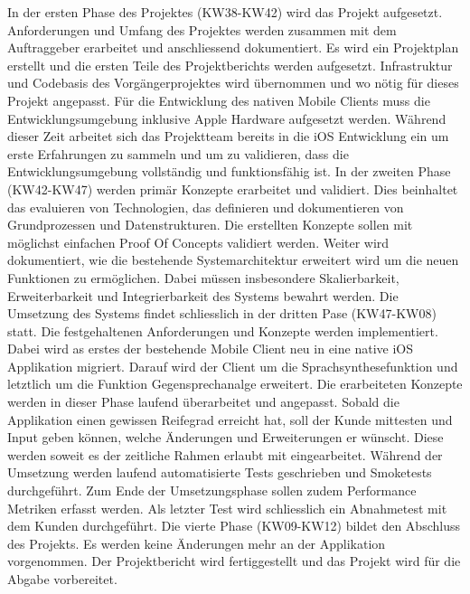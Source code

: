 In der ersten Phase des Projektes (KW38-KW42) wird das Projekt aufgesetzt.
Anforderungen und Umfang des Projektes werden zusammen mit dem Auftraggeber erarbeitet und anschliessend dokumentiert.
Es wird ein Projektplan erstellt und die ersten Teile des Projektberichts werden aufgesetzt.
Infrastruktur und Codebasis des Vorgängerprojektes wird übernommen und wo nötig für dieses Projekt angepasst.
Für die Entwicklung des nativen Mobile Clients muss die Entwicklungsumgebung inklusive Apple Hardware aufgesetzt werden.
Während dieser Zeit arbeitet sich das Projektteam bereits in die iOS Entwicklung ein um erste Erfahrungen zu sammeln und um zu validieren, dass die Entwicklungsumgebung vollständig und funktionsfähig ist.
In der zweiten Phase (KW42-KW47) werden primär Konzepte erarbeitet und validiert.
Dies beinhaltet das evaluieren von Technologien, das definieren und dokumentieren von Grundprozessen und Datenstrukturen.
Die erstellten Konzepte sollen mit möglichst einfachen Proof Of Concepts validiert werden.
Weiter wird dokumentiert, wie die bestehende Systemarchitektur erweitert wird um die neuen Funktionen zu ermöglichen.
Dabei müssen insbesondere Skalierbarkeit, Erweiterbarkeit und Integrierbarkeit des Systems bewahrt werden.
Die Umsetzung des Systems findet schliesslich in der dritten Pase (KW47-KW08) statt.
Die festgehaltenen Anforderungen und Konzepte werden implementiert.
Dabei wird as erstes der bestehende Mobile Client neu in eine native iOS Applikation migriert.
Darauf wird der Client um die Sprachsynthesefunktion und letztlich um die Funktion Gegensprechanalge erweitert.
Die erarbeiteten Konzepte werden in dieser Phase laufend überarbeitet und angepasst.
Sobald die Applikation einen gewissen Reifegrad erreicht hat, soll der Kunde mittesten und Input geben können, welche Änderungen und Erweiterungen er wünscht.
Diese werden soweit es der zeitliche Rahmen erlaubt mit eingearbeitet.
Während der Umsetzung werden laufend automatisierte Tests geschrieben und Smoketests durchgeführt.
Zum Ende der Umsetzungsphase sollen zudem Performance Metriken erfasst werden.
Als letzter Test wird schliesslich ein Abnahmetest mit dem Kunden durchgeführt.
Die vierte Phase (KW09-KW12) bildet den Abschluss des Projekts.
Es werden keine Änderungen mehr an der Applikation vorgenommen.
Der Projektbericht wird fertiggestellt und das Projekt wird für die Abgabe vorbereitet.

\clearpage
